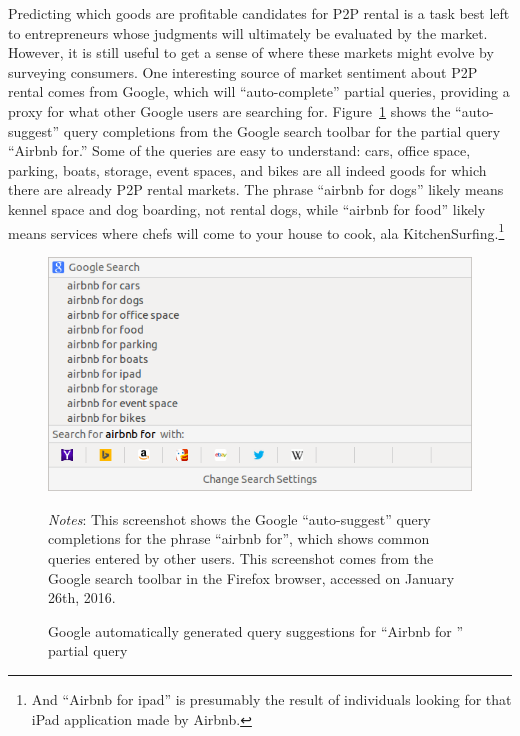 \documentclass[11pt]{article}
\begin{document}
Predicting which goods are profitable candidates for P2P rental is a task best left to entrepreneurs whose judgments will ultimately be evaluated by the market. 
However, it is still useful to get a sense of where these markets might evolve by surveying consumers. 
One interesting source of market sentiment about P2P rental comes from Google, which will ``auto-complete'' partial queries, providing a proxy for what other Google users are searching for. 
Figure~\ref{fig:auto} shows the ``auto-suggest'' query completions from the Google search toolbar for the partial query ``Airbnb for.''
Some of the queries are easy to understand: 
cars, office space, parking, boats, storage, event spaces, and bikes are all indeed goods for which there are already P2P rental markets. 
The phrase ``airbnb for dogs'' likely means kennel space and dog boarding, not rental dogs, while ``airbnb for food'' likely means services where chefs will come to your house to cook, ala KitchenSurfing.\footnote{
  And ``Airbnb for ipad'' is presumably the result of individuals looking for that iPad application made by Airbnb.
}

\begin{figure}
\centering 
\caption{Google automatically generated query suggestions for ``Airbnb for '' partial query}
\label{fig:auto} 
\begin{minipage}{0.70 \linewidth}
  \includegraphics[width = \linewidth]{./images/airbnb_for_x.png} \\
  \begin{footnotesize}
  \emph{Notes}: This screenshot shows the Google ``auto-suggest'' query completions for the phrase ``airbnb for'', which shows common queries entered by other users.
  This screenshot comes from the Google search toolbar in the Firefox browser, accessed on January 26th, 2016.
  \end{footnotesize}
\end{minipage}
\end{figure} 
\end{document}
